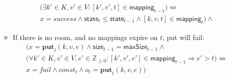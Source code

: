 \documentclass{article}
\renewcommand{\o}[1]{\ensuremath{\mathbf{#1}}}
\newcommand{\p}[1]{\ensuremath{\mathit{#1}}}
\newcommand{\s}[1]{\ensuremath{\mathsf{#1}}}
\newcommand{\nintset}{\ensuremath{\mathds{Z}_{\ge 0}}}
\begin{document}
\begin{itemize}
\begin{itemize}
\begin{gather}
      \big(\exists k'\in K, v'\in V: [k', v', t] \in \s{mapping}_{t-1}\big) \Leftrightarrow\nonumber\\
      x=success \wedge \s{state}_t \le \s{state}_{t-1} \wedge [k, v, t] \in \s{mapping}_t\Big)\wedge
      \label{eq:put4}
    \end{gather}
  \item If there is no room, and no mappings expire on $t$, put will fail:
    \begin{gather}
      \Big(x=\o{put}_t(k, v, e) \wedge \s{size}_{t-1} = \s{maxSize}_{t-1} \wedge \nonumber\\
      \big(\forall k'\in K, v'\in V, e' \in \nintset: [k', v', e'] \in \s{mapping}_{t-1} \Rightarrow e' > t \big) \Leftrightarrow\nonumber\\
      x=fail \wedge \p{const}_t \wedge o_t = \o{put}_t(k,v,e)\Big)
      \label{eq:put5}
    \end{gather}
  \end{itemize}

\end{itemize}
\end{document}
